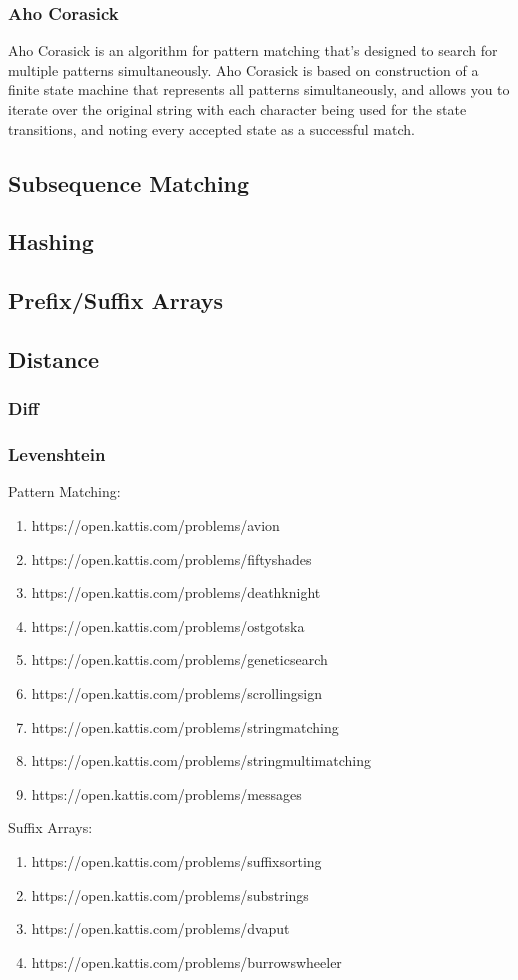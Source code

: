 \subsubsection{Aho Corasick}

Aho Corasick is an algorithm for pattern matching that's designed to search for multiple patterns simultaneously. Aho Corasick is based on construction of a finite state machine that represents all patterns simultaneously, and allows you to iterate over the original string with each character being used for the state transitions, and noting every accepted state as a successful match.

\subsection{Subsequence Matching}
\subsection{Hashing}
\subsection{Prefix/Suffix Arrays}
\subsection{Distance}
\subsubsection{Diff}
\subsubsection{Levenshtein}

\hrulefill

Pattern Matching:
\begin{enumerate}
\item https://open.kattis.com/problems/avion
\item https://open.kattis.com/problems/fiftyshades
\item https://open.kattis.com/problems/deathknight
\item https://open.kattis.com/problems/ostgotska
\item https://open.kattis.com/problems/geneticsearch
\item https://open.kattis.com/problems/scrollingsign
\item https://open.kattis.com/problems/stringmatching
\item https://open.kattis.com/problems/stringmultimatching
\item https://open.kattis.com/problems/messages
\end{enumerate}

Suffix Arrays:
\begin{enumerate}
\item https://open.kattis.com/problems/suffixsorting
\item https://open.kattis.com/problems/substrings
\item https://open.kattis.com/problems/dvaput
\item https://open.kattis.com/problems/burrowswheeler
\end{enumerate}

